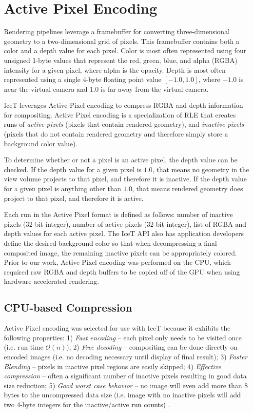 \documentclass{vgtc}                          %
\begin{document}
\section{Active Pixel Encoding}\label{sec:active_pixel}
Rendering pipelines leverage a framebuffer for converting three-dimensional geometry to a two-dimensional grid of pixels. This framebuffer contains both a color and a depth value for each pixel. Color is most often represented using four unsigned 1-byte values that represent the red, green, blue, and alpha (RGBA) intensity for a given pixel, where alpha is the opacity. Depth is most often represented using a single 4-byte floating point value $[-1.0,1.0]$, where $-1.0$ is near the virtual camera and $1.0$ is far away from the virtual camera.

IceT leverages Active Pixel encoding to compress RGBA and depth information for compositing. Active Pixel encoding is a specialization of RLE that creates runs of \textit{active pixels} (pixels that contain rendered geometry), and \textit{inactive pixels} (pixels that do not contain rendered geometry and therefore simply store a background color value).

To determine whether or not a pixel is an active pixel, the depth value can be checked. If the depth value for a given pixel is $1.0$, that means no geometry in the view volume projects to that pixel, and therefore it is inactive. If the depth value for a given pixel is anything other than $1.0$, that means rendered geometry does project to that pixel, and therefore it is active. 

Each run in the Active Pixel format is defined as follows: number of inactive pixels (32-bit integer), number of active pixels (32-bit integer), list of RGBA and depth values for each active pixel. The IceT API also has application developers define the desired background color so that when decompressing a final composited image, the remaining inactive pixels can be appropriately colored. Prior to our work, Active Pixel encoding was performed on the CPU, which required raw RGBA and depth buffers to be copied off of the GPU when using hardware accelerated rendering.

\subsection{CPU-based Compression}
Active Pixel encoding was selected for use with IceT because it exhibits the following properties: 1) \textit{Fast encoding} -- each pixel only needs to be visited once (i.e. run time $\mathcal{O}(n)$); 2) \textit{Free decoding} -- compositing can be done directly on encoded images (i.e. no decoding necessary until display of final result); 3) \textit{Faster Blending} -- pixels in inactive pixel regions are easily skipped; 4) \textit{Effective compression} -- often a significant number of inactive pixels resulting in good data size reduction; 5) \textit{Good worst case behavior} -- no image will even add more than 8 bytes to the uncompressed data size (i.e. image with no inactive pixels will add two 4-byte integers for the inactive/active run counts) \cite{IceT_UserGuide}.
\end{document}
